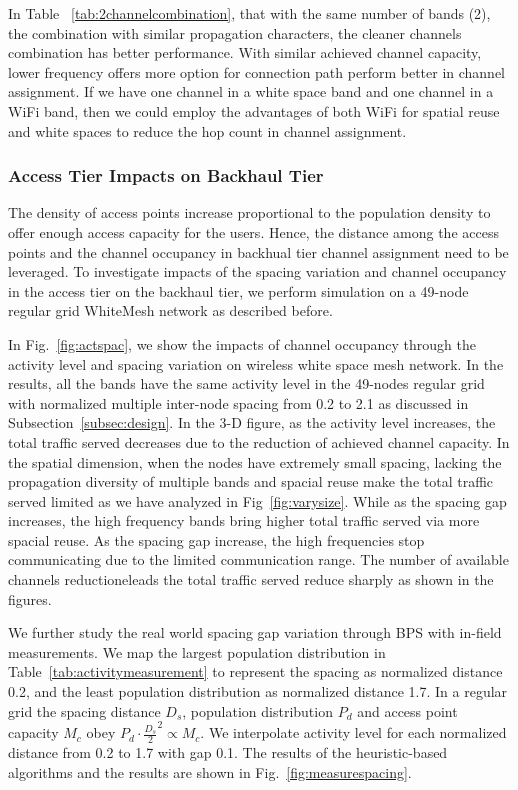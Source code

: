 In Table ~\ref{tab:2channelcombination}, that with the same number of bands (2), 
the combination with similar propagation characters, the cleaner channels combination 
has better performance. With similar achieved channel capacity, lower frequency 
offers more option for connection path perform better in channel assignment. 
If we have one channel in a white space band and one channel in a WiFi band, then 
we could employ the advantages of both WiFi for spatial reuse and white spaces to 
reduce the hop count in channel assignment. 

\subsubsection{Access Tier Impacts on Backhaul Tier}

The density of access points increase proportional to the population 
density to offer enough access capacity for the users. 
Hence, the distance among the access points and the channel 
occupancy in backhual tier channel assignment need to be leveraged.
To investigate impacts of the spacing variation and channel occupancy in the access tier 
on the backhaul tier, we perform simulation on a 49-node regular grid WhiteMesh network as
described before. 

In Fig.~\ref{fig:actspac}, we show the impacts of channel occupancy through 
the activity level and spacing variation on wireless white space mesh network. 
In the results, all the bands have the same activity level in the 49-nodes regular 
grid with normalized multiple inter-node spacing 
from 0.2 to 2.1 as discussed in Subsection~\ref{subsec:design}. In the 3-D figure, 
as the activity level increases, the total traffic served decreases due to the reduction 
of achieved channel capacity. In the spatial dimension, when the nodes have extremely
small spacing, lacking the propagation diversity of multiple bands and spacial reuse  make the total traffic served
limited as we have analyzed in Fig~\ref{fig:varysize}. 
While as the spacing gap increases, the high frequency bands
bring higher total traffic served via more spacial reuse. 
As the spacing gap increase, the high frequencies stop communicating due to the limited 
communication range. The number of available channels reductioneleads the total traffic served 
reduce sharply as shown in the figures.

We further study the real world spacing gap variation through BPS with in-field measurements.
We map the largest population distribution in Table~\ref{tab:activitymeasurement} to 
represent the spacing as normalized distance 0.2, and the least population distribution 
as normalized distance 1.7. In a regular grid the spacing distance $D_s$, population 
distribution $P_d$ and access point capacity $M_c$ obey $P_d \cdot \frac{D_s}{2} ^2 \propto M_c$. 
We interpolate activity level for each normalized distance from 0.2 to 1.7 with gap 0.1. 
The results of the heuristic-based algorithms and the results are shown in Fig.~\ref{fig:measurespacing}.

